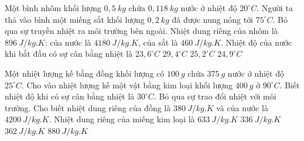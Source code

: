 \begin{ex}%
	Một bình nhôm khối lượng $0,5\ kg$ chứa $0,118\ kg$ nước ở nhiệt độ $20^\circ C$. Người ta thả vào bình một miếng sắt khối lượng $0,2\ kg$ đã được nung nóng tới $75^\circ C$. Bỏ qua sự truyền nhiệt ra môi trường bên ngoài. Nhiệt dung riêng của nhôm là $896\ J/kg.K$; của nước là $4180\ J/kg.K$, của sắt là $460\ J/kg.K$. Nhiệt độ của nước khi bắt đầu có sự cân bằng nhiệt là
	\choice
	{$23,6^\circ C$}
	{$29,4^\circ C$}
	{$25,2^\circ C$}
	{\True $24,9^\circ C$}
	\end{ex}
	\begin{ex}%
	Một nhiệt lượng kế bằng đồng khối lượng có $100\ g$ chứa $375\ g$ nước ở nhiệt độ $25^\circ C$. Cho vào nhiệt lượng kế một vật bằng kim loại khối lượng $400\ g$ ở $90^\circ C$. Biết nhiệt độ khi có sự cân bằng nhiệt là $30^\circ C$. Bỏ qua sự trao đổi nhiệt với môi trường. Cho biết nhiệt dung riêng của đồng là $380\ J/kg.K$ và của nước là $4200\ J/kg.K$. Nhiệt dung riêng của miếng kim loại là
	\choice
	{$633\ J/kg. K$}
	{\True $336\ J/kg. K$}
	{$362\ J/kg. K$}
	{$880\ J/kg. K$}
	\end{ex}





